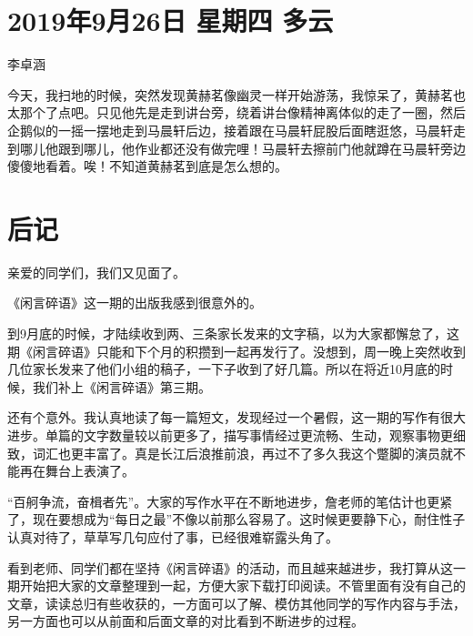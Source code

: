 \section{2019年9月26日 星期四 多云}

李卓涵

今天，我扫地的时候，突然发现黄赫茗像幽灵一样开始游荡，我惊呆了，黄赫茗也太那个了点吧。只见他先是走到讲台旁，绕着讲台像精神离体似的走了一圈，然后企鹅似的一摇一摆地走到马晨轩后边，接着跟在马晨轩屁股后面瞎逛悠，马晨轩走到哪儿他跟到哪儿，他作业都还没有做完哩！马晨轩去擦前门他就蹲在马晨轩旁边傻傻地看着。唉！不知道黄赫茗到底是怎么想的。

\section{后记}

亲爱的同学们，我们又见面了。

《闲言碎语》这一期的出版我感到很意外的。

到9月底的时候，才陆续收到两、三条家长发来的文字稿，以为大家都懈怠了，这期《闲言碎语》只能和下个月的积攒到一起再发行了。没想到，周一晚上突然收到几位家长发来了他们小组的稿子，一下子收到了好几篇。所以在将近10月底的时候，我们补上《闲言碎语》第三期。

还有个意外。我认真地读了每一篇短文，发现经过一个暑假，这一期的写作有很大进步。单篇的文字数量较以前更多了，描写事情经过更流畅、生动，观察事物更细致，词汇也更丰富了。真是长江后浪推前浪，再过不了多久我这个蹩脚的演员就不能再在舞台上表演了。

``百舸争流，奋楫者先''。大家的写作水平在不断地进步，詹老师的笔估计也更紧了，现在要想成为``每日之最''不像以前那么容易了。这时候更要静下心，耐住性子认真对待了，草草写几句应付了事，已经很难崭露头角了。

看到老师、同学们都在坚持《闲言碎语》的活动，而且越来越进步，我打算从这一期开始把大家的文章整理到一起，方便大家下载打印阅读。不管里面有没有自己的文章，读读总归有些收获的，一方面可以了解、模仿其他同学的写作内容与手法，另一方面也可以从前面和后面文章的对比看到不断进步的过程。

